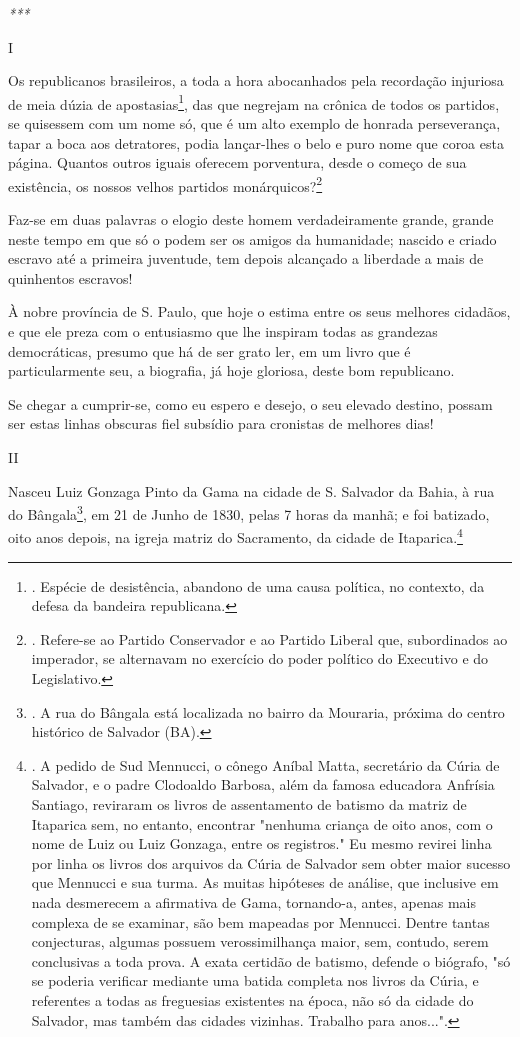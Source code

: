 \emph{***}

I

Os republicanos brasileiros, a toda a hora abocanhados pela recordação
injuriosa de meia dúzia de apostasias\footnote{. Espécie de desistência,
  abandono de uma causa política, no contexto, da defesa da bandeira
  republicana.}, das que negrejam na crônica de todos os partidos, se
quisessem com um nome só, que é um alto exemplo de honrada perseverança,
tapar a boca aos detratores, podia lançar-lhes o belo e puro nome que
coroa esta página. Quantos outros iguais oferecem porventura, desde o
começo de sua existência, os nossos velhos partidos
monárquicos?\footnote{. Refere-se ao Partido Conservador e ao Partido
  Liberal que, subordinados ao imperador, se alternavam no exercício do
  poder político do Executivo e do Legislativo.}

Faz-se em duas palavras o elogio deste homem verdadeiramente grande,
grande neste tempo em que só o podem ser os amigos da humanidade;
nascido e criado escravo até a primeira juventude, tem depois alcançado
a liberdade a mais de quinhentos escravos!

À nobre província de S. Paulo, que hoje o estima entre os seus melhores
cidadãos, e que ele preza com o entusiasmo que lhe inspiram todas as
grandezas democráticas, presumo que há de ser grato ler, em um livro que
é particularmente seu, a biografia, já hoje gloriosa, deste bom
republicano.

Se chegar a cumprir-se, como eu espero e desejo, o seu elevado destino,
possam ser estas linhas obscuras fiel subsídio para cronistas de
melhores dias!

II

Nasceu Luiz Gonzaga Pinto da Gama na cidade de S. Salvador da Bahia, à
rua do Bângala\footnote{. A rua do Bângala está localizada no bairro da
  Mouraria, próxima do centro histórico de Salvador (BA).}, em 21 de
Junho de 1830, pelas 7 horas da manhã; e foi batizado, oito anos depois,
na igreja matriz do Sacramento, da cidade de Itaparica.\footnote{. A
  pedido de Sud Mennucci, o cônego Aníbal Matta, secretário da Cúria de
  Salvador, e o padre Clodoaldo Barbosa, além da famosa educadora
  Anfrísia Santiago, reviraram os livros de assentamento de batismo da
  matriz de Itaparica sem, no entanto, encontrar "nenhuma criança de
  oito anos, com o nome de Luiz ou Luiz Gonzaga, entre os registros." Eu
  mesmo revirei linha por linha os livros dos arquivos da Cúria de
  Salvador sem obter maior sucesso que Mennucci e sua turma. As muitas
  hipóteses de análise, que inclusive em nada desmerecem a afirmativa de
  Gama, tornando-a, antes, apenas mais complexa de se examinar, são bem
  mapeadas por Mennucci. Dentre tantas conjecturas, algumas possuem
  verossimilhança maior, sem, contudo, serem conclusivas a toda prova. A
  exata certidão de batismo, defende o biógrafo, "só se poderia
  verificar mediante uma batida completa nos livros da Cúria, e
  referentes a todas as freguesias existentes na época, não só da cidade
  do Salvador, mas também das cidades vizinhas. Trabalho para anos...".}

